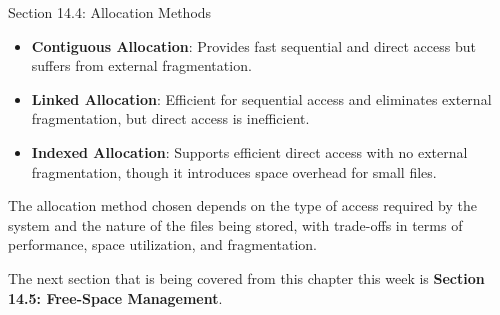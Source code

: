 \begin{notes}{Section 14.4: Allocation Methods}
\begin{highlight}
    \end{highlight}
    
    \begin{highlight}
    
        \begin{itemize}
            \item \textbf{Contiguous Allocation}: Provides fast sequential and direct access but suffers from external fragmentation.
            \item \textbf{Linked Allocation}: Efficient for sequential access and eliminates external fragmentation, but direct access is inefficient.
            \item \textbf{Indexed Allocation}: Supports efficient direct access with no external fragmentation, though it introduces space overhead for small files.
        \end{itemize}
    
    The allocation method chosen depends on the type of access required by the system and the nature of the files being stored, with trade-offs in terms of performance, space utilization, and fragmentation.
    
    \end{highlight}
\end{notes}

The next section that is being covered from this chapter this week is \textbf{Section 14.5: Free-Space Management}.


